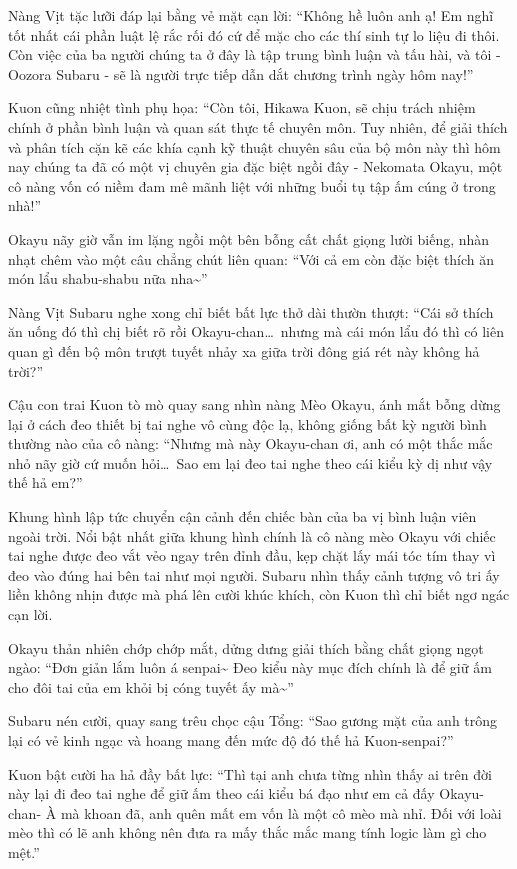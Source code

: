 \documentclass[../main.tex]{subfiles}
\begin{document}
Nàng Vịt tặc lưỡi đáp lại bằng vẻ mặt cạn lời: ``Không hề luôn anh ạ! Em nghĩ tốt nhất cái phần luật lệ rắc rối đó cứ để mặc cho các thí sinh tự lo liệu đi thôi. Còn việc của ba người chúng ta ở đây là tập trung bình luận và tấu hài, và tôi - Oozora Subaru - sẽ là người trực tiếp dẫn dắt chương trình ngày hôm nay!''

Kuon cũng nhiệt tình phụ họa: ``Còn tôi, Hikawa Kuon, sẽ chịu trách nhiệm chính ở phần bình luận và quan sát thực tế chuyên môn. Tuy nhiên, để giải thích và phân tích cặn kẽ các khía cạnh kỹ thuật chuyên sâu của bộ môn này thì hôm nay chúng ta đã có một vị chuyên gia đặc biệt ngồi đây - Nekomata Okayu, một cô nàng vốn có niềm đam mê mãnh liệt với những buổi tụ tập ấm cúng ở trong nhà!''

Okayu nãy giờ vẫn im lặng ngồi một bên bỗng cất chất giọng lười biếng, nhàn nhạt chêm vào một câu chẳng chút liên quan: ``Với cả em còn đặc biệt thích ăn món lẩu shabu-shabu nữa nha\~{}''

Nàng Vịt Subaru nghe xong chỉ biết bất lực thở dài thườn thượt: ``Cái sở thích ăn uống đó thì chị biết rõ rồi Okayu-chan\dots\ nhưng mà cái món lẩu đó thì có liên quan gì đến bộ môn trượt tuyết nhảy xa giữa trời đông giá rét này không hả trời?''

Cậu con trai Kuon tò mò quay sang nhìn nàng Mèo Okayu, ánh mắt bỗng dừng lại ở cách đeo thiết bị tai nghe vô cùng độc lạ, không giống bất kỳ người bình thường nào của cô nàng: ``Nhưng mà này Okayu-chan ơi, anh có một thắc mắc nhỏ nãy giờ cứ muốn hỏi\dots\ Sao em lại đeo tai nghe theo cái kiểu kỳ dị như vậy thế hả em?''


Khung hình lập tức chuyển cận cảnh đến chiếc bàn của ba vị bình luận viên ngoài trời. Nổi bật nhất giữa khung hình chính là cô nàng mèo Okayu với chiếc tai nghe được đeo vắt vẻo ngay trên đỉnh đầu, kẹp chặt lấy mái tóc tím thay vì đeo vào đúng hai bên tai như mọi người. Subaru nhìn thấy cảnh tượng vô tri ấy liền không nhịn được mà phá lên cười khúc khích, còn Kuon thì chỉ biết ngơ ngác cạn lời.

Okayu thản nhiên chớp chớp mắt, dửng dưng giải thích bằng chất giọng ngọt ngào: ``Đơn giản lắm luôn á senpai\~{} Đeo kiểu này mục đích chính là để giữ ấm cho đôi tai của em khỏi bị cóng tuyết ấy mà\~{}''

Subaru nén cười, quay sang trêu chọc cậu Tổng: ``Sao gương mặt của anh trông lại có vẻ kinh ngạc và hoang mang đến mức độ đó thế hả Kuon-senpai?''

Kuon bật cười ha hả đầy bất lực: ``Thì tại anh chưa từng nhìn thấy ai trên đời này lại đi đeo tai nghe để giữ ấm theo cái kiểu bá đạo như em cả đấy Okayu-chan- À mà khoan đã, anh quên mất em vốn là một cô mèo mà nhỉ. Đối với loài mèo thì có lẽ anh không nên đưa ra mấy thắc mắc mang tính logic làm gì cho mệt.''
\end{document}
